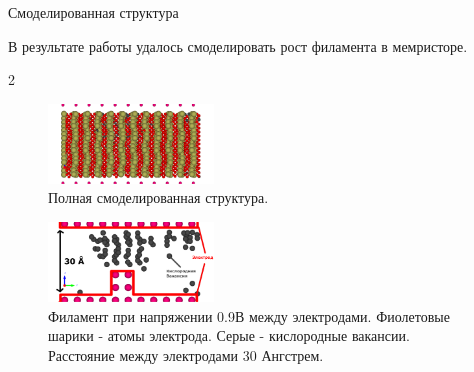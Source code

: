 \documentclass{beamer}%
\begin{document}




\begin{frame}{Смоделированная структура}{}

В результате работы удалось смоделировать рост филамента в мемристоре.

\begin {multicols} {2}

\begin{figure}
    \centering
    \includegraphics[height=80px]{img/11000_full_ex.pdf}
    \caption{Полная смоделированная структура.
    }
\end{figure}
\columnbreak

\begin{figure}
    \centering
    \includegraphics[height=80px]{img/11000_ex.pdf}
    \caption{Филамент при напряжении 0.9В между электродами.
    Фиолетовые шарики - атомы электрода.
    Серые - кислородные вакансии.
    Расстояние между электродами 30 Ангстрем.
    }
\end{figure}

\end{multicols}
\end{frame}
\end{document}
